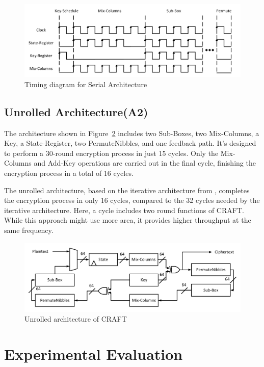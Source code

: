\documentclass[sn-basic]{sn-jnl}%
\begin{document}
\begin{figure}[h]%
    \centering
    \includegraphics[width=\textwidth]{serial-time.pdf}
    \caption{Timing diagram for Serial Architecture}\label{serial_time_diagrm}
\end{figure}
\subsection{Unrolled Architecture(A2)}\label{subsec3}

The architecture shown in Figure~\ref{fig4} includes two Sub-Boxes, two Mix-Columns, a Key, a State-Register, two PermuteNibbles, and one feedback path. It's designed to perform a 30-round encryption process in just 15 cycles. Only the Mix-Columns and Add-Key operations are carried out in the final cycle, finishing the encryption process in a total of 16 cycles.

The unrolled architecture, based on the iterative architecture from \cite{beierle2019craft}, completes the encryption process in only 16 cycles, compared to the 32 cycles needed by the iterative architecture. Here, a cycle includes two round functions of CRAFT. While this approach might use more area, it provides higher throughput at the same frequency.


\begin{figure}[h]%
    \centering
    \includegraphics[width=\textwidth]{unrolled-archticture.pdf}
    \caption{Unrolled architecture of CRAFT}\label{fig4}
\end{figure}


\section{Experimental Evaluation}\label{sec4}
\end{document}
